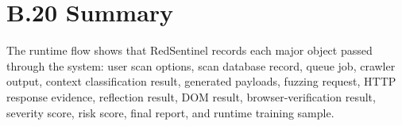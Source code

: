 \section*{B.20 Summary}

The runtime flow shows that RedSentinel records each major object passed through the system: user scan options, scan database record, queue job, crawler output, context classification result, generated payloads, fuzzing request, HTTP response evidence, reflection result, DOM result, browser-verification result, severity score, risk score, final report, and runtime training sample.

\endgroup